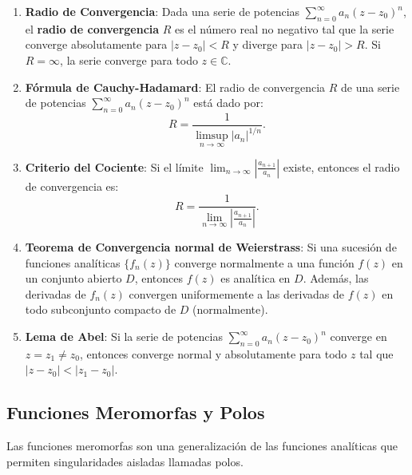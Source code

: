 \documentclass[letterpaper]{book}
\begin{document}
\begin{enumerate}

\item \textbf{Radio de Convergencia}:
Dada una serie de potencias \(\sum_{n=0}^\infty a_n (z - z_0)^n\), el \textbf{radio de convergencia} \(R\) es el número real no negativo tal que la serie converge absolutamente para \(|z - z_0| < R\) y diverge para \(|z - z_0| > R\). Si \(R = \infty\), la serie converge para todo \(z \in \mathbb{C}\).

\item \textbf{Fórmula de Cauchy-Hadamard}:
El radio de convergencia \(R\) de una serie de potencias \(\sum_{n=0}^\infty a_n (z - z_0)^n\) está dado por:
\[
R = \frac{1}{\limsup_{n \to \infty} |a_n|^{1/n}}.
\]

\item \textbf{Criterio del Cociente}:
Si el límite \(\lim_{n \to \infty} \left| \frac{a_{n+1}}{a_n} \right|\) existe, entonces el radio de convergencia es:
\[
R = \frac{1}{\lim_{n \to \infty} \left| \frac{a_{n+1}}{a_n} \right|}.
\]

\item \textbf{Teorema de Convergencia normal de Weierstrass}:
Si una sucesión de funciones analíticas \(\{f_n(z)\}\) converge normalmente a una función \(f(z)\) en un conjunto abierto \(D\), entonces \(f(z)\) es analítica en \(D\). Además, las derivadas de \(f_n(z)\) convergen uniformemente a las derivadas de \(f(z)\) en todo subconjunto compacto de \(D\) (normalmente).

\item \textbf{Lema de Abel}:
Si la serie de potencias \(\sum_{n=0}^\infty a_n (z - z_0)^n\) converge en \(z = z_1 \neq z_0\), entonces converge normal y absolutamente para todo \(z\) tal que \(|z - z_0| < |z_1 - z_0|\).

\end{enumerate}
\subsection{Funciones Meromorfas y Polos}

\noindent Las funciones meromorfas son una generalización de las funciones analíticas que permiten singularidades aisladas llamadas polos.
\end{document}

